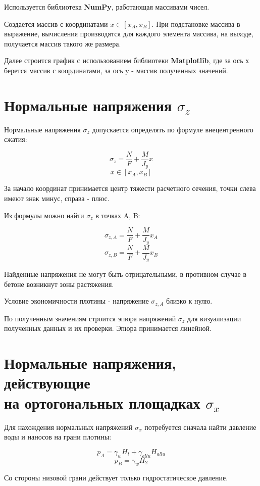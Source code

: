 \documentclass[12pt,a4paper,oneside,draft,titlepage]{article}
\begin{document}
Используется библиотека \textbf{NumPy}, работающая массивами чисел.

Создается массив с координатами $x \in [x_A, x_B]$.
При подстановке массива в выражение, вычисления производятся для каждого элемента массива, на выходе, получается массив такого же размера.

Далее строится график с использованием библиотеки \textbf{Matplotlib}, где за ось х берется массив с координатами, за ось y - массив полученных значений.


\section{Нормальные напряжения $\sigma_z$}

Нормальные напряжения $\sigma_z$ допускается определять по формуле внецентренного сжатия:

$$ \sigma_z = \frac{N}{F} + \frac{M}{J_y}x $$
$$ x \in [x_A, x_B] $$

За начало координат принимается центр тяжести расчетного сечения, точки слева имеют знак минус, справа - плюс.

Из формулы можно найти $\sigma_z$ в точках A, B:

$$ \sigma_{z,A} = \frac{N}{F} + \frac{M}{J_y}x_A $$
$$ \sigma_{z,B} = \frac{N}{F} + \frac{M}{J_y}x_B $$

Найденные напряжения не могут быть отрицательными, в противном случае в бетоне возникнут зоны растяжения.

Условие экономичности плотины - напряжение $\sigma_{z,A}$ близко к нулю.\newline

По полученным значениям строится эпюра напряжений $\sigma_z$ для визуализации полученных данных и их проверки. Эпюра принимается линейной.

\section{Нормальные напряжения, действующие\\ на ортогональных площадках $\sigma_x$}

Для нахождения нормальных напряжений $\sigma_x$ потребуется сначала найти давление воды и наносов на грани плотины:

$$ p_A = \gamma_w  H_t + \gamma_{allu}  H_{allu} $$
$$ p_B = \gamma_w  H_2 $$

Со стороны низовой грани действует только гидростатическое давление.
\end{document}
